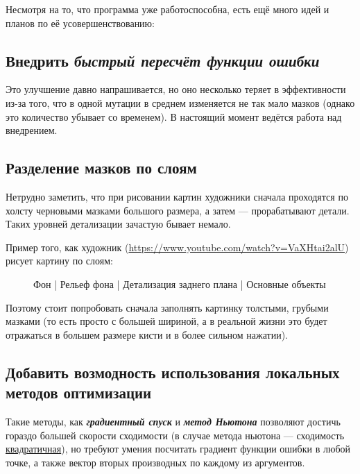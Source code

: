 Несмотря на то, что программа уже работоспособна, есть ещё много идей и планов по её усовершенствованию:


 \subsection{Внедрить \textit{быстрый пересчёт функции ошибки}}
Это улучшение давно напрашивается,
но оно несколько теряет в эффективности из-за того, что в одной мутации в среднем изменяется
не так мало мазков (однако это количество убывает со временем).
В настоящий момент ведётся работа над внедрением.

\subsection{Разделение мазков по слоям}
 Нетрудно заметить, что при рисовании картин художники сначала проходятся по холсту черновыми мазками большого размера, а затем — прорабатывают детали.
 Таких уровней детализации зачастую бывает немало.

 Пример того, как художник (\href{https://www.youtube.com/watch?v=VaXHtai2alU}{https://www.youtube.com/watch?v=VaXHtai2alU}) рисует картину по слоям:

\begin{figure}[h!]
    \centering
    \caption{ Фон | Рельеф фона | Детализация заднего плана | Основные объекты}
    \label{fig:layered_painting}
\end{figure}


Поэтому стоит попробовать сначала заполнять картинку толстыми, грубыми мазками
(то есть просто с большей шириной, а в реальной жизни это будет отражаться в большем размере кисти и в более сильном нажатии).

\subsection{Добавить возмодность использования локальных методов оптимизации}
Такие методы, как \textbf\textit{{градиентный спуск}} и \textbf\textit{{метод Ньютона}} позволяют достичь гораздо большей скорости сходимости
(в случае метода ньютона — сходимость \href{http://w.ict.nsc.ru/books/textbooks/akhmerov/mo_unicode/4.html}{квадратичная}),
но требуют умения посчитать градиент функции ошибки в любой точке, а также вектор вторых производных по каждому из аргументов.

